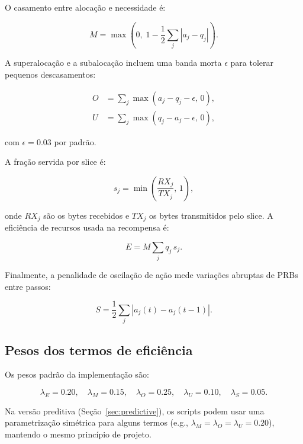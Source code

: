\documentclass[10pt,a4paper]{IEEEtran}
\begin{document}
O casamento entre aloca\c{c}\~{a}o e necessidade \'{e}:

\begin{equation}
M = \max\!\left(0,\; 1 - \frac{1}{2}\sum_{j} |a_j - q_j|\right).
\label{eq:match}
\end{equation}

A superaloca\c{c}\~{a}o e a subaloca\c{c}\~{a}o incluem uma
banda morta $\epsilon$ para tolerar pequenos descasamentos:

\begin{align}
O &= \sum_{j} \max(a_j - q_j - \epsilon,\, 0), \label{eq:over} \\
U &= \sum_{j} \max(q_j - a_j - \epsilon,\, 0), \label{eq:under}
\end{align}

com $\epsilon = 0.03$ por padr\~{a}o.

A fra\c{c}\~{a}o servida por slice \'{e}:

\begin{equation}
s_j = \min\!\left(\frac{RX_j}{TX_j},\, 1\right),
\label{eq:served}
\end{equation}

onde $RX_j$ s\~{a}o os bytes recebidos e $TX_j$ os bytes
transmitidos pelo slice. A efici\^{e}ncia de recursos
usada na recompensa \'{e}:

\begin{equation}
E = M \sum_{j} q_j\,s_j.
\label{eq:efficiency}
\end{equation}

Finalmente, a penalidade de oscila\c{c}\~{a}o de a\c{c}\~{a}o
mede varia\c{c}\~{o}es abruptas de PRBs entre passos:

\begin{equation}
S = \frac{1}{2}\sum_{j} |a_j(t) - a_j(t-1)|.
\label{eq:smoothness}
\end{equation}

\subsection{Pesos dos termos de efici\^{e}ncia}

Os pesos padr\~{a}o da implementa\c{c}\~{a}o s\~{a}o:

\begin{equation}
\lambda_E=0.20,\quad
\lambda_M=0.15,\quad
\lambda_O=0.25,\quad
\lambda_U=0.10,\quad
\lambda_S=0.05.
\label{eq:eff_weights}
\end{equation}

Na vers\~{a}o preditiva (Se\c{c}\~{a}o~\ref{sec:predictive}),
os scripts podem usar uma parametriza\c{c}\~{a}o
sim\'{e}trica para alguns termos (e.g.,
$\lambda_M=\lambda_O=\lambda_U=0.20$), mantendo o mesmo
princ\'{i}pio de projeto.
\end{document}
